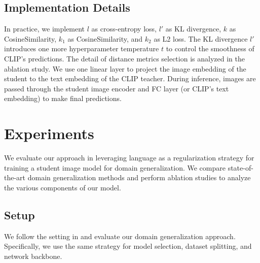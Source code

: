 \documentclass[10pt,twocolumn,letterpaper]{article}
\begin{document}
\subsection{Implementation Details}

In practice, we implement $l$ as cross-entropy loss, 
$l'$ as KL divergence, $k$ as CosineSimilarity, $k_1$ as CosineSimilarity, and $k_2$ as L2 loss. The KL divergence $l'$ introduces one more hyperparameter temperature $t$ to control the smoothness of CLIP's predictions. The detail of distance metrics selection is analyzed in the ablation study.
We use one linear layer to project the image embedding of the student to the text embedding of the CLIP teacher. During inference, images are passed through the student image encoder and FC layer (or CLIP's text embedding) to make final predictions.

















 \section{Experiments}
\label{sec:exp}
We evaluate our approach in leveraging language as a regularization strategy for training a student image model for domain generalization.  We compare state-of-the-art domain generalization methods and perform ablation studies to analyze the various components of our model.  

\subsection{Setup}
We follow the setting in \cite{gulrajani2020search, ye2021ood} and evaluate our domain generalization approach. Specifically, we use the same strategy for model selection, dataset splitting, and network backbone. 
\end{document}
